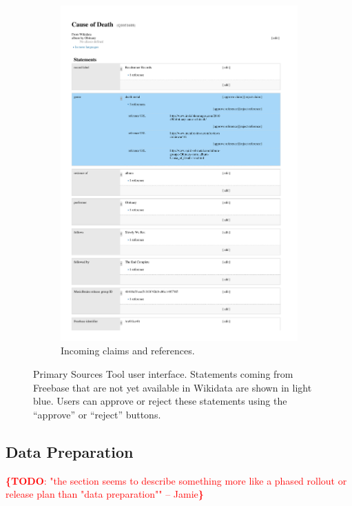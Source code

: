 \documentclass{acm_proc_article-sp}
\newcommand{\todo}[1]{\noindent\textcolor{red}{{\bf \{TODO}: #1{\bf \}}}}
\begin{document}
\begin{figure}[!t]
\begin{subfigure}[b]{1.0\columnwidth}
        \includegraphics[width=\textwidth]{img/wikidata-cause-of-death.pdf}
        \caption{Incoming claims and references.}
        \label{fig:cause-of-death}
    \end{subfigure}
    \caption{Primary Sources Tool user interface. Statements coming from
       Freebase that are not yet available in Wikidata are shown in light blue.
       Users can approve or reject these statements using the ``approve'' or ``reject'' buttons.}
    \label{fig:primary-sources-tool}
\end{figure}


\subsection{Data Preparation}
\todo{"the section seems to describe something more like a phased rollout or release plan than "data preparation"" -- Jamie}
\end{document}
